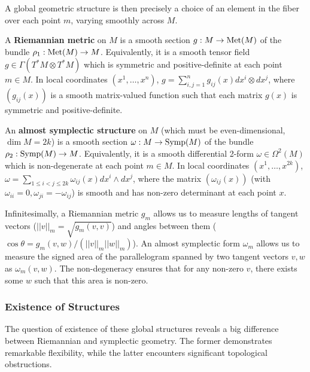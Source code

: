 A global geometric structure is then precisely a choice of an element in the fiber over each point $m$, varying smoothly across $M$.

\begin{definition}
\label{def:global_structures_sections}
    A \textbf{Riemannian metric} on $M$ is a smooth section $g: M \to \operatorname{Met}(M)$ of the bundle $\rho_1 : \operatorname{Met}(M) \to M$. Equivalently, it is a smooth tensor field $g \in \Gamma(T^*M \otimes T^*M)$ which is symmetric and positive-definite at each point $m \in M$. In local coordinates $(x^1, \dots, x^n)$, $g = \sum_{i,j=1}^n g_{ij}(x) dx^i \otimes dx^j$, where $(g_{ij}(x))$ is a smooth matrix-valued function such that each matrix $g(x)$ is symmetric and positive-definite.

    An \textbf{almost symplectic structure} on $M$ (which must be even-dimensional, $\dim M = 2k$) is a smooth section $\omega: M \to \operatorname{Symp}(M)$ of the bundle $\rho_2 : \operatorname{Symp}(M) \to M$. Equivalently, it is a smooth differential 2-form $\omega \in \Omega^{2}(M)$ which is non-degenerate at each point $m \in M$. In local coordinates $(x^1, \dots, x^{2k})$, $\omega = \sum_{1 \le i < j \le 2k} \omega_{ij}(x) dx^i \wedge dx^j$, where the matrix $(\omega_{ij}(x))$ (with $\omega_{ii}=0, \omega_{ji}=-\omega_{ij}$) is smooth and has non-zero determinant at each point $x$.
\end{definition}

\begin{remark}
Infinitesimally, a Riemannian metric $g_m$ allows us to measure lengths of tangent vectors ($||v||_m = \sqrt{g_m(v,v)}$) and angles between them ($\cos \theta = g_m(v, w) / (||v||_m ||w||_m)$). An almost symplectic form $\omega_m$ allows us to measure the signed area of the parallelogram spanned by two tangent vectors $v, w$ as $\omega_m(v, w)$. The non-degeneracy ensures that for any non-zero $v$, there exists some $w$ such that this area is non-zero.
\end{remark}

\subsubsection{Existence of Structures}

The question of existence of these global structures reveals a big difference between Riemannian and symplectic geometry. The former demonstrates remarkable flexibility, while the latter encounters significant topological obstructions.

